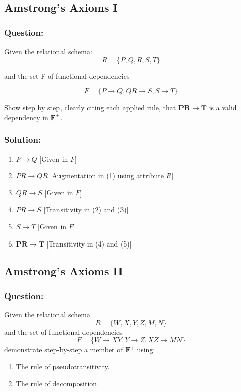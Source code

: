 \documentclass{article}
\begin{document}
\subsection{Amstrong's Axioms I}

\subsubsection*{Question:}
Given the relational schema:
    $$R = \{P, Q, R, S, T\}$$

and the set F of functional dependencies

    $$F = \{ P \rightarrow Q, QR \rightarrow S, S \rightarrow T \}$$

Show step by step, clearly citing each applied rule, that $\mathbf{PR \rightarrow T}$ is a valid dependency in $\mathbf{F^+}$.

\subsubsection*{Solution:}
    \begin{enumerate}
        \item $P \rightarrow Q$ \hfill [Given in $F$]
        \item $PR \rightarrow QR$ \hfill [Augmentation in (1) using attribute $R$]
        \item $QR \rightarrow S$ \hfill [Given in $F$]
        \item $PR \rightarrow S$ \hfill [Transitivity in (2) and (3)]
        \item $S \rightarrow T$ \hfill [Given in $F$]
        \item $\mathbf{PR \rightarrow T}$ \hfill [Transitivity in (4) and (5)]
    \end{enumerate}

\subsection{Amstrong's Axioms II}

\subsubsection*{Question:}
Given the relational schema
    $$R = \{W, X, Y, Z, M, N\}$$
    and the set of functional dependencies
    $$F = \{ W \rightarrow XY, Y \rightarrow Z, XZ \rightarrow MN \}$$
    demonstrate step-by-step a member of $\mathbf{F^+}$ using:

    \begin{enumerate}
        \item The rule of pseudotransitivity.
        \item The rule of decomposition.
    \end{enumerate}
\end{document}
